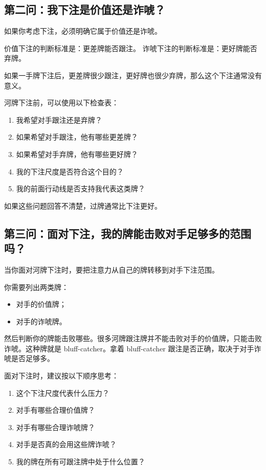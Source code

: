 \subsection{第二问：我下注是价值还是诈唬？}

如果你考虑下注，必须明确它属于价值还是诈唬。

价值下注的判断标准是：更差牌能否跟注。
诈唬下注的判断标准是：更好牌能否弃牌。

如果一手牌下注后，更差牌很少跟注，更好牌也很少弃牌，那么这个下注通常没有意义。

河牌下注前，可以使用以下检查表：

\begin{enumerate}
\item 我希望对手跟注还是弃牌？
\item 如果希望对手跟注，他有哪些更差牌？
\item 如果希望对手弃牌，他有哪些更好牌？
\item 我的下注尺度是否符合这个目的？
\item 我的前面行动线是否支持我代表这类牌？
\end{enumerate}

如果这些问题回答不清楚，过牌通常比下注更好。

\subsection{第三问：面对下注，我的牌能击败对手足够多的范围吗？}

当你面对河牌下注时，要把注意力从自己的牌转移到对手下注范围。

你需要列出两类牌：

\begin{itemize}
\item 对手的价值牌；
\item 对手的诈唬牌。
\end{itemize}

然后判断你的牌能击败哪些。很多河牌跟注牌并不能击败对手的价值牌，只能击败诈唬。这种牌就是 bluff-catcher。拿着 bluff-catcher 跟注是否正确，取决于对手诈唬是否足够多。

面对下注时，建议按以下顺序思考：

\begin{enumerate}
\item 这个下注尺度代表什么压力？
\item 对手有哪些合理价值牌？
\item 对手有哪些合理诈唬牌？
\item 对手是否真的会用这些牌诈唬？
\item 我的牌在所有可跟注牌中处于什么位置？
\end{enumerate}

